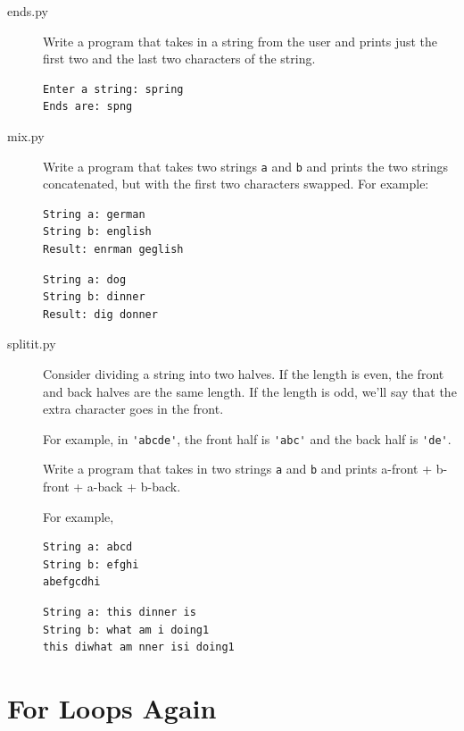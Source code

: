 \documentclass[11pt]{cselabheader}
\begin{document}
\begin{description}
  \item[ends.py] Write a program that takes in a string from the user and prints
    just the first two and the last two characters of the string.

    \begin{lstlisting}[style=bash]
Enter a string: spring
Ends are: spng
    \end{lstlisting}

  \item[mix.py] Write a program that takes two strings
    \lstinline!a! and \lstinline!b! and prints the two strings concatenated, but
    with the first two characters swapped. For example:

    \begin{lstlisting}[style=bash]
String a: german
String b: english
Result: enrman geglish
    \end{lstlisting}

    \begin{lstlisting}[style=bash]
String a: dog
String b: dinner
Result: dig donner
    \end{lstlisting}

  \item[splitit.py] Consider dividing a string into two halves. If the length is
    even, the front and back halves are the same length. If the length is odd,
    we'll say that the extra character goes in the front. 

    For example, in \lstinline!'abcde'!, the front half is \lstinline!'abc'! and
    the back half is \lstinline!'de'!. 

    Write a program that takes in two strings \lstinline!a! and \lstinline!b!
    and prints a-front + b-front + a-back + b-back.

    For example,
    \begin{lstlisting}[style=bash]
String a: abcd
String b: efghi
abefgcdhi
    \end{lstlisting}
    \begin{lstlisting}[style=bash]
String a: this dinner is
String b: what am i doing1
this diwhat am nner isi doing1
    \end{lstlisting}
\end{description}

\pagebreak
\section{For Loops Again}
\end{document}
